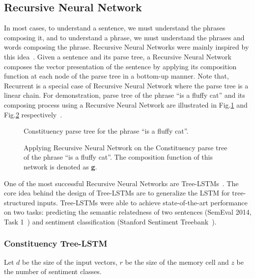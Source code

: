 \subsection{Recursive Neural Network}\label{sec:recursive-nn}
In most cases, to understand a sentence, we must understand the phrases composing it, and to understand a phrase, we must understand the phrases and words composing the phrase.
Recursive Neural Networks were mainly inspired by this idea~\cite{treeLSTM}.
Given a sentence and its parse tree, a Recursive Neural Network composes the vector presentation of the sentence by applying its composition function at each node of the parse tree in a bottom-up manner.
Note that, Recurrent is a special case of Recursive Neural Network where the parse tree is a linear chain.
For demonstration, parse tree of the phrase ``is a fluffy cat'' and its composing process using a Recursive Neural Network are illustrated in Fig.\ref{fig:example-parse} and Fig.\ref{fig:example-compose} respectively~\cite{tag-embedding-rnn}.
\begin{figure}[]
	\centering
	
	\caption[Constituency parse tree for the phrase ``is a fluffy cat'']{Constituency parse tree for the phrase ``is a fluffy cat''.}
	\label{fig:example-parse}
\end{figure}
\begin{figure}[]
	\centering
	
	\caption[Applying Recursive Neural Network on the phrase ``is a fluffy cat'']{Applying Recursive Neural Network on the Constituency parse tree of the phrase ``is a fluffy cat''.
		The composition function of this network is denoted as \textbf{g}.}
	\label{fig:example-compose}
\end{figure}

One of the most successful Recursive Neural Networks are Tree-LSTMs~\cite{treeLSTM}.
The core idea behind the design of Tree-LSTMs are to generalize the LSTM for tree-structured inputs.
Tree-LSTMs were able to achieve state-of-the-art performance on two tasks: predicting the semantic relatedness of two sentences (SemEval 2014, Task 1~\cite{SemeEvalTask1}) and sentiment classification (Stanford Sentiment Treebank~\cite{socher2013recursive}).
\subsubsection{Constituency Tree-LSTM}\label{treelstm}
Let \(d\) be the size of the input vectors, \(r
\) be the size of the memory cell and \(z\) be the number of sentiment classes.
